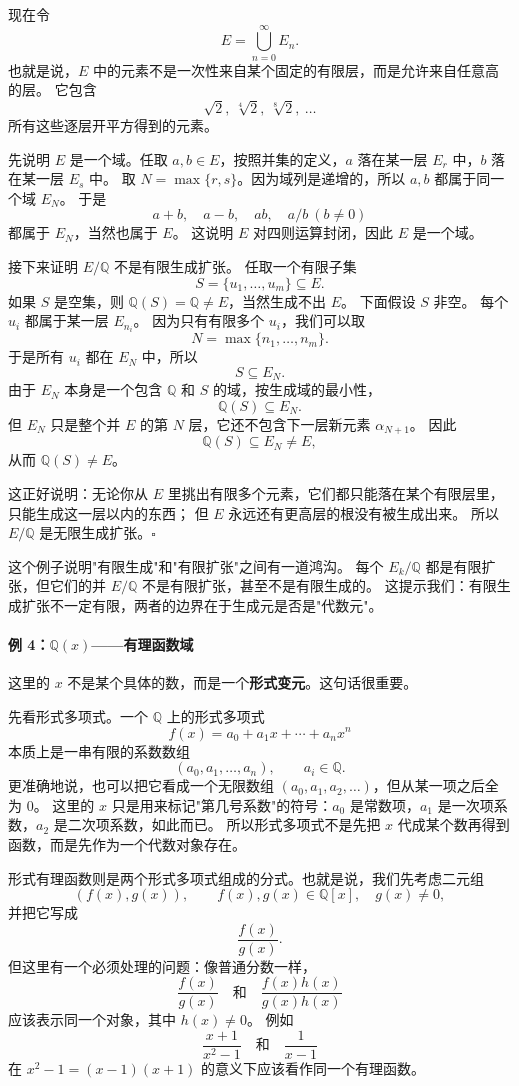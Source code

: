 现在令
\[
E=\bigcup_{n=0}^{\infty}E_n.
\]
也就是说，$E$ 中的元素不是一次性来自某个固定的有限层，而是允许来自任意高的层。
它包含
\[
\sqrt{2},\ \sqrt[4]{2},\ \sqrt[8]{2},\ \ldots
\]
所有这些逐层开平方得到的元素。

先说明 $E$ 是一个域。任取 $a,b\in E$，按照并集的定义，$a$ 落在某一层 $E_r$ 中，$b$ 落在某一层 $E_s$ 中。
取 $N=\max\{r,s\}$。因为域列是递增的，所以 $a,b$ 都属于同一个域 $E_N$。
于是
\[
a+b,\quad a-b,\quad ab,\quad a/b\ (b\neq 0)
\]
都属于 $E_N$，当然也属于 $E$。
这说明 $E$ 对四则运算封闭，因此 $E$ 是一个域。

接下来证明 $E/\mathbb{Q}$ 不是有限生成扩张。
任取一个有限子集
\[
S=\{u_1,\ldots,u_m\}\subseteq E.
\]
如果 $S$ 是空集，则 $\mathbb{Q}(S)=\mathbb{Q}\neq E$，当然生成不出 $E$。
下面假设 $S$ 非空。
每个 $u_i$ 都属于某一层 $E_{n_i}$。
因为只有有限多个 $u_i$，我们可以取
\[
N=\max\{n_1,\ldots,n_m\}.
\]
于是所有 $u_i$ 都在 $E_N$ 中，所以
\[
S\subseteq E_N.
\]
由于 $E_N$ 本身是一个包含 $\mathbb{Q}$ 和 $S$ 的域，按生成域的最小性，
\[
\mathbb{Q}(S)\subseteq E_N.
\]
但 $E_N$ 只是整个并 $E$ 的第 $N$ 层，它还不包含下一层新元素 $\alpha_{N+1}$。
因此
\[
\mathbb{Q}(S)\subseteq E_N\neq E,
\]
从而 $\mathbb{Q}(S)\neq E$。

这正好说明：无论你从 $E$ 里挑出有限多个元素，它们都只能落在某个有限层里，只能生成这一层以内的东西；
但 $E$ 永远还有更高层的根没有被生成出来。
所以 $E/\mathbb{Q}$ 是无限生成扩张。$\square$

这个例子说明"有限生成"和"有限扩张"之间有一道鸿沟。
每个 $E_k/\mathbb{Q}$ 都是有限扩张，但它们的并 $E/\mathbb{Q}$ 不是有限扩张，甚至不是有限生成的。
这提示我们：有限生成扩张不一定有限，两者的边界在于生成元是否是"代数元"。

\paragraph*{例 4：$\mathbb{Q}(x)$——有理函数域}
这里的 $x$ 不是某个具体的数，而是一个\textbf{形式变元}。这句话很重要。

先看形式多项式。一个 $\mathbb{Q}$ 上的形式多项式
\[
f(x)=a_0+a_1x+\cdots+a_nx^n
\]
本质上是一串有限的系数数组
\[
(a_0,a_1,\ldots,a_n),\qquad a_i\in\mathbb{Q}.
\]
更准确地说，也可以把它看成一个无限数组 $(a_0,a_1,a_2,\ldots)$，但从某一项之后全为 $0$。
这里的 $x$ 只是用来标记"第几号系数"的符号：$a_0$ 是常数项，$a_1$ 是一次项系数，$a_2$ 是二次项系数，如此而已。
所以形式多项式不是先把 $x$ 代成某个数再得到函数，而是先作为一个代数对象存在。

形式有理函数则是两个形式多项式组成的分式。也就是说，我们先考虑二元组
\[
(f(x),g(x)),\qquad f(x),g(x)\in\mathbb{Q}[x],\quad g(x)\neq 0,
\]
并把它写成
\[
\frac{f(x)}{g(x)}.
\]
但这里有一个必须处理的问题：像普通分数一样，
\[
\frac{f(x)}{g(x)}
\quad\text{和}\quad
\frac{f(x)h(x)}{g(x)h(x)}
\]
应该表示同一个对象，其中 $h(x)\neq 0$。
例如
\[
\frac{x+1}{x^2-1}
\quad\text{和}\quad
\frac{1}{x-1}
\]
在 $x^2-1=(x-1)(x+1)$ 的意义下应该看作同一个有理函数。

